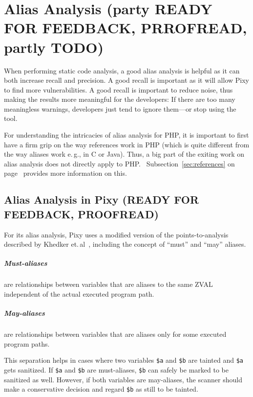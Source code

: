 \chapter{Alias Analysis (party READY FOR FEEDBACK, PRROFREAD, partly TODO)}

When performing static code analysis, a good alias analysis is helpful as it can both increase recall and precision. A good recall is important as it will allow Pixy to find more vulnerabilities. A good recall is important to reduce noise, thus making the results more meaningful for the developers: If there are too many meaningless warnings, developers just tend to ignore them---or stop using the tool.~\cite{understanding-value}

For understanding the intricacies of alias analysis for PHP, it is important to first have a firm grip on the way references work in PHP (which is quite different from the way aliases work e.\,g., in C or Java). Thus, a big part of the exiting work on alias analysis does not directly apply to PHP.~\cite[page~24]{pixy} Subsection~\ref{sec:references} on page~\pageref{sec:references} provides more information on this.

\section{Alias Analysis in Pixy (READY FOR FEEDBACK, PROOFREAD)}

For its alias analysis, Pixy uses a modified version of the points-to-analysis described by Khedker et.\,al~\cite[page 119ff]{data-flow-analysis}, including the concept of ``must'' and ``may'' aliases.

\paragraph{Must-aliases} are relationships between variables that are aliases to the same ZVAL independent of the actual executed program path.

\paragraph{May-aliases} are relationships between variables that are aliases only for some executed program paths.

This separation helps in cases where two variables \texttt{\$a} and \texttt{\$b} are tainted and \texttt{\$a} gets sanitized. If \texttt{\$a} and \texttt{\$b} are must-aliases, \texttt{\$b} can safely be marked to be sanitized as well. However, if both variables are may-aliases, the scanner should make a conservative decision and regard \texttt{\$b} as still to be tainted.

